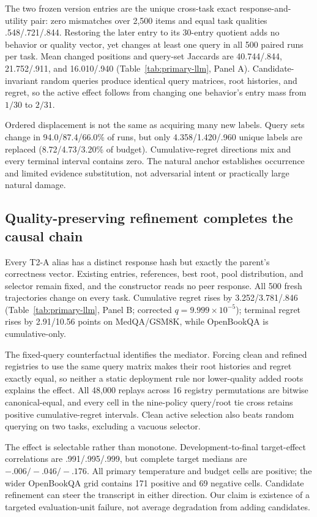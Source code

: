 The two frozen version entries are the unique cross-task exact response-and-utility pair: zero mismatches over 2,500 items and equal task qualities .548/.721/.844. Restoring the later entry to its 30-entry quotient adds no behavior or quality vector, yet changes at least one query in all 500 paired runs per task. Mean changed positions and query-set Jaccards are 40.744/.844, 21.752/.911, and 16.010/.940 (Table~\ref{tab:primary-llm}, Panel A). Candidate-invariant random queries produce identical query matrices, root histories, and regret, so the active effect follows from changing one behavior's entry mass from $1/30$ to $2/31$.



Ordered displacement is not the same as acquiring many new labels. Query sets change in 94.0/87.4/66.0\% of runs, but only 4.358/1.420/.960 unique labels are replaced (8.72/4.73/3.20\% of budget). Cumulative-regret directions mix and every terminal interval contains zero. The natural anchor establishes occurrence and limited evidence substitution, not adversarial intent or practically large natural damage.

\subsection{Quality-preserving refinement completes the causal chain}

Every T2-A alias has a distinct response hash but exactly the parent's correctness vector. Existing entries, references, best root, pool distribution, and selector remain fixed, and the constructor reads no peer response. All 500 fresh trajectories change on every task. Cumulative regret rises by 3.252/3.781/.846 (Table~\ref{tab:primary-llm}, Panel B; corrected $q=9.999\times10^{-5}$); terminal regret rises by 2.91/10.56 points on MedQA/GSM8K, while OpenBookQA is cumulative-only.

The fixed-query counterfactual identifies the mediator. Forcing clean and refined registries to use the same query matrix makes their root histories and regret exactly equal, so neither a static deployment rule nor lower-quality added roots explains the effect. All 48,000 replays across 16 registry permutations are bitwise canonical-equal, and every cell in the nine-policy query/root tie cross retains positive cumulative-regret intervals. Clean active selection also beats random querying on two tasks, excluding a vacuous selector.

The effect is selectable rather than monotone. Development-to-final target-effect correlations are .991/.995/.999, but complete target medians are $-.006/-.046/-.176$. All primary temperature and budget cells are positive; the wider OpenBookQA grid contains 171 positive and 69 negative cells. Candidate refinement can steer the transcript in either direction. Our claim is existence of a targeted evaluation-unit failure, not average degradation from adding candidates.


